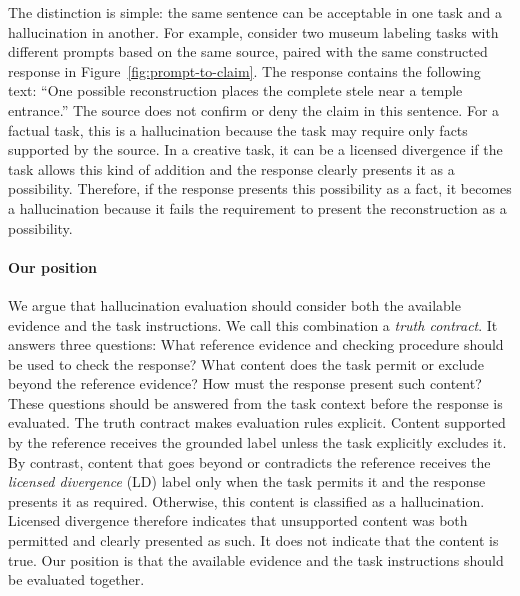 \documentclass{clv2025}
\newcommand{\LD}{\textsc{LD}}
\begin{document}

The distinction is simple: the same sentence can be acceptable in one task and
a hallucination in another. For example, consider two museum labeling tasks with different prompts based on the same
source, paired with the same constructed response in Figure~\ref{fig:prompt-to-claim}. 
The response contains the following text: ``One possible reconstruction places the complete
stele near a temple entrance.'' The source does not confirm or deny the claim in this 
sentence.
For a factual task, this is a hallucination because the task may require only
facts supported by the source. In a creative task, it can be a licensed divergence
if the task allows this kind of addition and the response clearly presents it
as a possibility.
Therefore, if the response presents this possibility as a fact, it becomes a hallucination
because it fails the requirement to present the reconstruction as a possibility.




\paragraph{Our position}
We argue that hallucination evaluation should consider both the available
evidence and the task instructions. We call this combination a \emph{truth
contract}. It answers three questions: What reference evidence and checking procedure should be used to check the response? What content does the task permit or exclude beyond the reference evidence? How must the response present such content? 
These questions should be answered from the task context
before the response is evaluated.
The truth contract makes evaluation rules explicit. Content supported by the reference receives the grounded label unless the task explicitly excludes it.
By contrast, content that goes beyond or contradicts the reference receives the \emph{licensed divergence} (\LD) label only when the task permits it and the response presents it as required.
Otherwise, this content is classified as a
hallucination. Licensed divergence therefore indicates
that unsupported content was both permitted and clearly presented as such. It
does not indicate that the content is true. Our position is that the available evidence and the task instructions should
be evaluated together.
\end{document}
